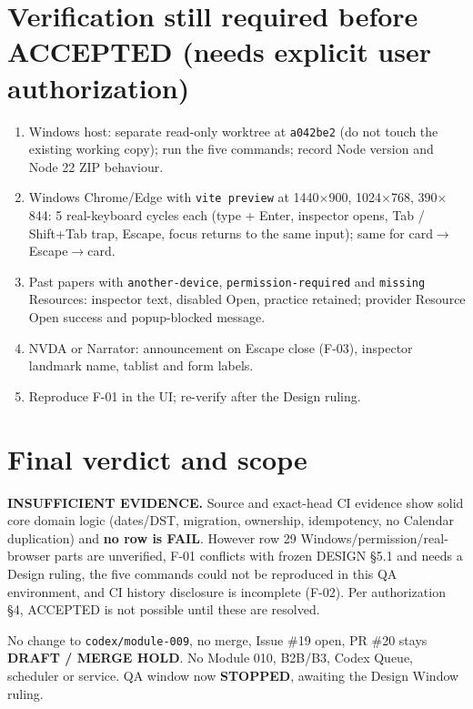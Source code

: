 \documentclass[11pt,a4paper]{article}
\newcommand{\sha}[1]{\texttt{\small #1}}
\begin{document}
\section{Verification still required before ACCEPTED (needs explicit user authorization)}
\begin{enumerate}[nosep]
  \item Windows host: separate read-only worktree at \sha{a042be2} (do not touch the existing working copy); run the five commands; record Node version and Node 22 ZIP behaviour.
  \item Windows Chrome/Edge with \texttt{vite preview} at 1440$\times$900, 1024$\times$768, 390$\times$844: 5 real-keyboard cycles each (type + Enter, inspector opens, Tab / Shift+Tab trap, Escape, focus returns to the same input); same for card$\to$Escape$\to$card.
  \item Past papers with \texttt{another-device}, \texttt{permission-required} and \texttt{missing} Resources: inspector text, disabled Open, practice retained; provider Resource Open success and popup-blocked message.
  \item NVDA or Narrator: announcement on Escape close (F-03), inspector landmark name, tablist and form labels.
  \item Reproduce F-01 in the UI; re-verify after the Design ruling.
\end{enumerate}

\section{Final verdict and scope}
\textbf{INSUFFICIENT EVIDENCE.} Source and exact-head CI evidence show solid core domain logic (dates/DST, migration, ownership, idempotency, no Calendar duplication) and \textbf{no row is FAIL}. However row 29 Windows/permission/real-browser parts are unverified, F-01 conflicts with frozen DESIGN \S5.1 and needs a Design ruling, the five commands could not be reproduced in this QA environment, and CI history disclosure is incomplete (F-02). Per authorization \S4, ACCEPTED is not possible until these are resolved.

No change to \texttt{codex/module-009}, no merge, Issue \#19 open, PR \#20 stays \textbf{DRAFT / MERGE HOLD}. No Module 010, B2B/B3, Codex Queue, scheduler or service. QA window now \textbf{STOPPED}, awaiting the Design Window ruling.
\end{document}
